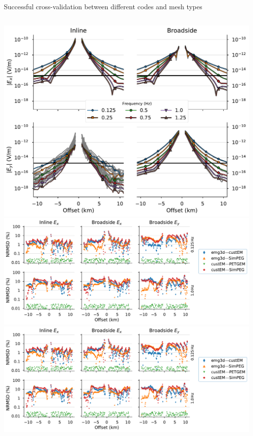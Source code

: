 \documentclass[xcolor=svgnames, aspectratio=169]{beamer}
\begin{document}
\begin{frame}[c]
  {Successful cross-validation between different codes and mesh types}
  \begin{columns}[c]
      \centering
      \includegraphics[width=\textwidth]{results-marlim-responses}
      \centering
      \includegraphics[width=\textwidth, trim=0 0 170 0, clip]{results-marlim_2ours}\\[.2cm]
      \includegraphics[width=.3\textwidth, trim=640 160 0 100, clip]{results-marlim_2ours}
  \end{columns}
\end{frame}
\end{document}
